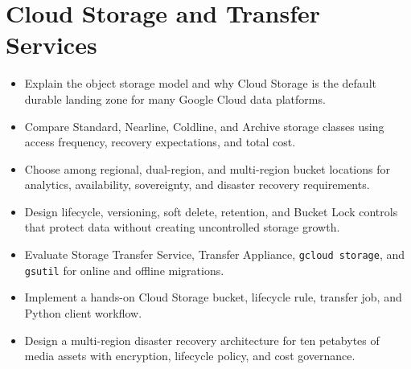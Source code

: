 \chapter{Cloud Storage and Transfer Services}

\begin{objectives}
\begin{itemize}
    \item Explain the object storage model and why Cloud Storage is the default durable landing zone for many Google Cloud data platforms.
    \item Compare Standard, Nearline, Coldline, and Archive storage classes using access frequency, recovery expectations, and total cost.
    \item Choose among regional, dual-region, and multi-region bucket locations for analytics, availability, sovereignty, and disaster recovery requirements.
    \item Design lifecycle, versioning, soft delete, retention, and Bucket Lock controls that protect data without creating uncontrolled storage growth.
    \item Evaluate Storage Transfer Service, Transfer Appliance, \texttt{gcloud storage}, and \texttt{gsutil} for online and offline migrations.
    \item Implement a hands-on Cloud Storage bucket, lifecycle rule, transfer job, and Python client workflow.
    \item Design a multi-region disaster recovery architecture for ten petabytes of media assets with encryption, lifecycle policy, and cost governance.
\end{itemize}
\end{objectives}

